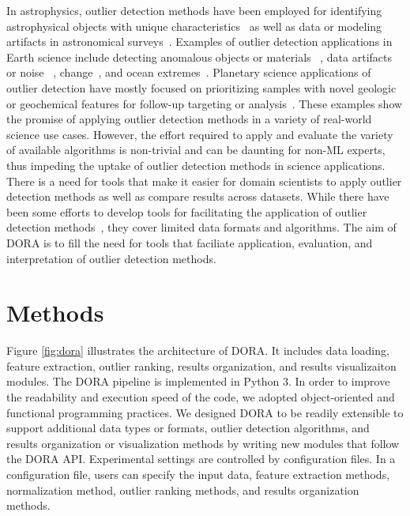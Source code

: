 \documentclass[letterpaper]{article} %
\begin{document}
In astrophysics, 
outlier detection methods have been employed for identifying astrophysical
objects with unique characteristics~\cite{xiong2010anomaly,
storey2020anomaly,hayat2021self} as well as data or modeling 
artifacts in astronomical surveys~\citep{wagstaff:des-anom20,
lochner2021astronomaly}. 
Examples of outlier detection applications in 
Earth science include detecting anomalous objects or materials
~\cite{chang2002anomaly,zhou2016novel}, data artifacts or noise 
~\cite{liu2017unsupervised,alvera2012outlier}, change~\cite{zhou2016novel,
touati2020anomaly}, and ocean extremes~\cite{prochaska2021deep}. 
Planetary science applications of outlier detection have mostly focused 
on prioritizing samples with novel geologic or geochemical features for
follow-up targeting or analysis~\cite{kerner2020analysis,kerner2020comparison,
wagstaff:demud13}.
%
These examples show the promise of applying outlier detection methods in
a variety of real-world science use cases. However, the effort required to 
apply and evaluate the variety of available algorithms is non-trivial and can 
be daunting for non-ML experts, thus impeding the uptake of outlier
detection methods in science applications.  
There is a need for tools that make it easier for domain scientists to apply
outlier detection methods as well as compare results across datasets.
While there have been some efforts to develop tools for facilitating the
application of outlier detection methods~\cite{zhao2019pyod}, they cover
limited data formats and algorithms. The aim of DORA is to fill the need 
for tools that faciliate application, evaluation, and interpretation of outlier
detection methods.

\section{Methods}

Figure \ref{fig:dora} illustrates the architecture of DORA. It includes 
data loading, feature extraction, outlier ranking, results organization, and 
results visualizaiton modules. The DORA pipeline is implemented in Python 3.
In order to improve the readability and execution speed of the code, we adopted
object-oriented and functional programming practices.  We designed DORA to be 
readily extensible to support additional data types or formats, outlier detection 
algorithms, and results organization or visualization methods by writing new 
modules that follow the DORA API. Experimental settings are controlled by 
configuration files. In a configuration file, users can specify the input data, 
feature extraction methods, normalization method, outlier ranking methods, and 
results organization methods. 
\end{document}
